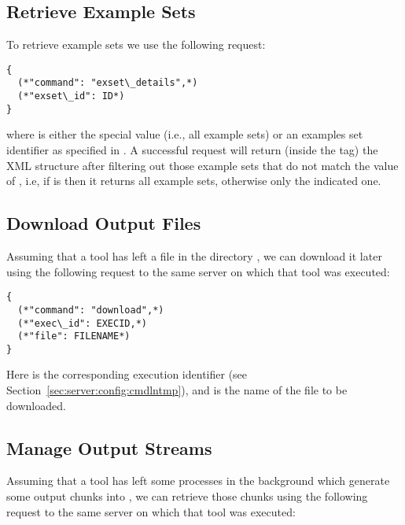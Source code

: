 \subsection{Retrieve Example Sets}
\label{sec:server:access:retexs}

To retrieve example sets we use the following request:

\bigskip
\begin{lstlisting}
{
  (*"command": "exset\_details",*)
  (*"exset\_id": ID*)
}
\end{lstlisting}

\bigskip
\noindent
where  is either the special value 
(i.e., all example sets) or an examples set identifier as specified in
.
%
A successful request will return (inside the  tag) the
XML structure  after filtering out
those example sets that do not match the value of , i.e, if
 is  then it returns all example sets,
otherwise only the indicated one.

\subsection{Download Output Files}
\label{sec:server:access:download}

Assuming that a tool has left a file in the directory
, we can
download it later using the following request to the same server on
which that tool was executed:

\medskip
\begin{lstlisting}
{
  (*"command": "download",*)
  (*"exec\_id": EXECID,*)
  (*"file": FILENAME*)
}
\end{lstlisting}

\medskip
\noindent
Here  is the corresponding execution identifier (see
Section~\ref{sec:server:config:cmdlntmp}), and  is the
name of the file to be downloaded.

\subsection{Manage Output Streams}
\label{sec:server:access:stream}


Assuming that a tool has left some processes in the background which
generate some output chunks into
, we can
retrieve those chunks using the following request to the same server on
which that tool was executed:

